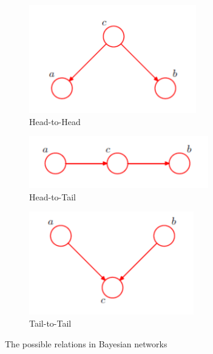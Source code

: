 \documentclass{article}
\begin{document}
\begin{figure}[h]
	\centering
	\begin{subfigure}[b]{0.3\textwidth}
		\includegraphics[width=\textwidth]{hth.png}
		\caption{Head-to-Head}
	\end{subfigure}
	\begin{subfigure}[b]{0.3\textwidth}
		\includegraphics[width=\textwidth]{htt.png}
		\caption{Head-to-Tail}
	\end{subfigure}
	\begin{subfigure}[b]{0.3\textwidth}
		\includegraphics[width=\textwidth]{ttt.png}
		\caption{Tail-to-Tail}
	\end{subfigure}
	\caption{The possible relations in Bayesian networks}
	\label{im:relations}
\end{figure}
\end{document}
